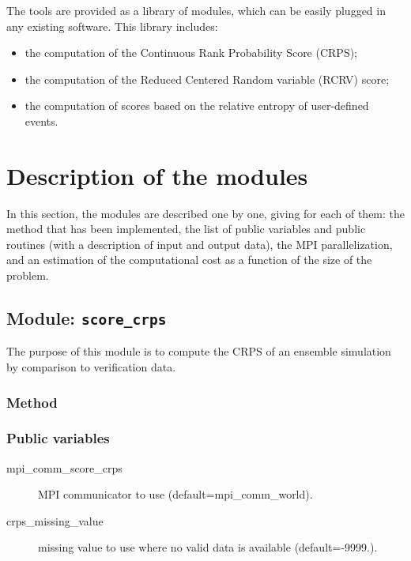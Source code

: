 \documentclass[11pt]{article}
\begin{document}
The tools are provided as a library of modules,
which can be easily plugged in any existing software.
This library includes:

\begin{itemize}
\item the computation of the Continuous Rank Probability Score (CRPS);
\item the computation of the Reduced Centered Random variable (RCRV) score;
\item the computation of scores based on the relative entropy of user-defined events.
\end{itemize}

\clearpage

\pagestyle{plain}

\section{Description of the modules}

In this section,
the modules are described one by one,
giving for each of them:
the method that has been implemented,
the list of public variables and public routines
(with a description of input and output data),
the MPI parallelization, and
an estimation of the computational cost
as a function of the size of the problem.

\subsection{Module: {\tt\bf score\_crps}}

The purpose of this module is to compute the CRPS
of an ensemble simulation by comparison to verification data.

\subsubsection*{Method}

\subsubsection*{Public variables}

\begin{description}
\item[mpi\_comm\_score\_crps] MPI communicator to use (default=mpi\_comm\_world).
\item[crps\_missing\_value] missing value to use where no valid data is available (default=-9999.).
\end{description}
\end{document}
